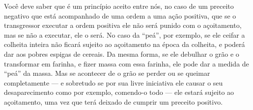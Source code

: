 Você deve saber que é um princípio aceito entre nós, no caso de um
preceito negativo que está acompanhado de uma ordem a uma ação positiva,
que se o transgressor executar a ordem positiva ele não será punido com
o açoitamento, mas se não a executar, ele o será. No caso da ``peá'',
por exemplo, se ele ceifar a colheita inteira não ficará sujeito ao
açoitamento na época da colheita, e poderá dar aos pobres espigas de
cereais. Da mesma forma, se ele debulhar o grão e o transformar em
farinha, e fizer massa com essa farinha, ele pode dar a medida de
``peá'' da massa. Mas se acontecer de o grão se perder ou se queimar
completamente --- e sobretudo se por sua livre iniciativa ele causar o
seu desaparecimento como por exemplo, comendo-o
todo --- ele estará sujeito ao açoitamento, uma vez que terá deixado de
cumprir um preceito positivo.

